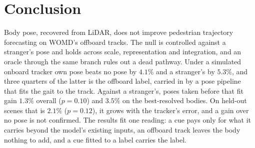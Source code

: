 \documentclass[conference]{IEEEtran}
\begin{document}
\section{Conclusion}
Body pose, recovered from LiDAR, does not improve pedestrian trajectory
forecasting on WOMD's offboard tracks. The null is controlled against a
stranger's pose and holds across scale, representation and integration,
and an oracle through the same branch rules out a dead pathway. Under a
simulated onboard tracker own pose beats no pose by $4.1\%$ and a stranger's
by $5.3\%$, and three quarters of the latter is the offboard label, carried in
by a pose pipeline that fits the gait to the track. Against a stranger's, poses
taken before that fit gain $1.3\%$ overall ($p{=}0.10$) and $3.5\%$ on the
best-resolved bodies. On held-out scenes
that is $2.1\%$ ($p{=}0.12$), it grows with the tracker's error, and a gain
over no pose is not confirmed. The results fit one reading: a cue pays only for what it carries
beyond the model's existing inputs, an offboard track leaves the body nothing to
add, and a cue fitted to a label carries the label.



\end{document}
